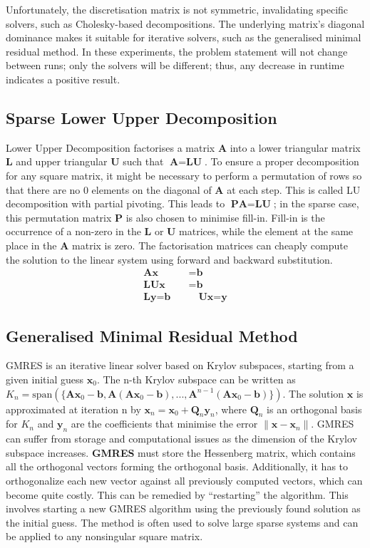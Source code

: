 Unfortunately, the discretisation matrix is not symmetric, invalidating specific solvers, such as Cholesky-based decompositions. The underlying matrix's diagonal dominance makes it suitable for iterative solvers, such as the generalised minimal residual method. In these experiments, the problem statement will not change between runs; only the solvers will be different; thus, any decrease in runtime indicates a positive result.

\subsection{Sparse Lower Upper Decomposition}
Lower Upper Decomposition factorises a matrix $\textbf{A}$ into a lower triangular matrix $\textbf{L}$ and upper triangular $\textbf{U}$ such that $\textbf{A} = \textbf{LU}$. To ensure a proper decomposition for any square matrix, it might be necessary to perform a permutation of rows so that there are no 0 elements on the diagonal of $\textbf{A}$ at each step. This is called LU decomposition with partial pivoting. This leads to $\textbf{PA} = \textbf{LU}$; in the sparse case, this permutation matrix $\textbf{P}$ is also chosen to minimise fill-in. Fill-in is the occurrence of a non-zero in the $\textbf{L}$ or $\textbf{U}$ matrices, while the element at the same place in the $\textbf{A}$ matrix is zero. The factorisation matrices can cheaply compute the solution to the linear system using forward and backward substitution.
\begin{align}
    \textbf{Ax} &= \textbf{b}\\
    \textbf{LUx}&= \textbf{b}\\
    \textbf{Ly} = \textbf{b} \quad &\quad \textbf{Ux} = \textbf{y}
\end{align}

\subsection{Generalised Minimal Residual Method}
GMRES is an iterative linear solver based on Krylov subspaces, starting from a given initial guess $\textbf{x}_0$. The n-th Krylov subspace can be written as $K_n = \mathrm{span}(\{\textbf{A}\textbf{x}_0-\textbf{b}, \textbf{A}(\textbf{A}\textbf{x}_0-\textbf{b}),...,\textbf{A}^{n-1}(\textbf{A}\textbf{x}_0-\textbf{b})\})$. The solution $\textbf{x}$ is approximated at iteration n by $\textbf{x}_n = \textbf{x}_0 + \textbf{Q}_n \textbf{y}_n$, where $\textbf{Q}_n$ is an orthogonal basis for $K_n$ and $\textbf{y}_n$ are the coefficients that minimise the error $\|\textbf{x}-\textbf{x}_n\|$. GMRES can suffer from storage and computational issues as the dimension of the Krylov subspace increases. \textbf{GMRES} must store the Hessenberg matrix, which contains all the orthogonal vectors forming the orthogonal basis. Additionally, it has to orthogonalize each new vector against all previously computed vectors, which can become quite costly. This can be remedied by ``restarting'' the algorithm. This involves starting a new GMRES algorithm using the previously found solution as the initial guess. The method is often used to solve large sparse systems and can be applied to any nonsingular square matrix\cite{he_parallel_2023}.



